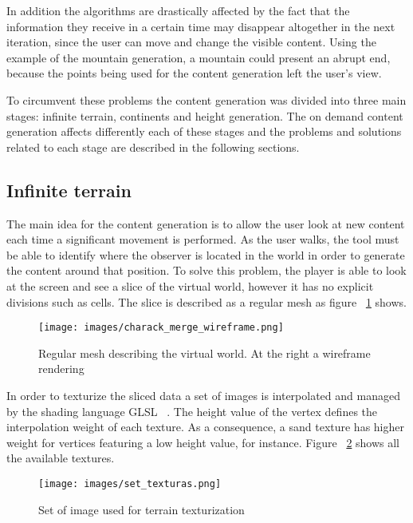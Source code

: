 \documentclass[10pt, conference, compsocconf]{IEEEtran}
\begin{document}
In addition the algorithms are drastically affected by the fact that the information they receive in a certain time may disappear altogether in the next iteration, since the user can move and change the visible content. Using the example of the mountain generation, a mountain could present an abrupt end, because the points being used for the content generation left the user's view. 

To circumvent these problems the content generation was divided into three main stages: infinite terrain, continents and height generation. The on demand content generation affects differently each of these stages and the problems and solutions related to each stage are described in the following sections. 

\subsection{Infinite terrain}

The main idea for the content generation is to allow the user look at new content each time a significant movement is performed. As the user walks, the tool must be able to identify where the observer is located in the world in order to generate the content around that position. To solve this problem, the player is able to look at the screen and see a slice of the virtual world, however it has no explicit divisions such as cells. The slice is described as a regular mesh as figure ~\ref{fig:charack_merge_wireframe} shows.

\begin{figure}
\centering
\texttt{[image: images/charack\_merge\_wireframe.png]}
\caption{Regular mesh describing the virtual world. At the right a wireframe rendering}
\label{fig:charack_merge_wireframe}
\end{figure}

In order to texturize the sliced data a set of images is interpolated and managed by the shading language GLSL ~\cite{glsl}. The height value of the vertex defines the interpolation weight of each texture. As a consequence, a sand texture has higher weight for vertices featuring a low height value, for instance. Figure ~\ref{fig:set_texturas} shows all the available textures.

\begin{figure}
\centering
\texttt{[image: images/set\_texturas.png]}
\caption{Set of image used for terrain texturization}
\label{fig:set_texturas}
\end{figure}
\end{document}
